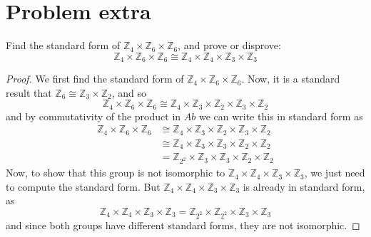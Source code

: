 \documentclass[fontsize=11pt]{scrartcl} %
\numberwithin{equation}{section} %
\numberwithin{figure}{section} %
\numberwithin{table}{section} %
\newcommand{\Z}{\mathbb{Z}}
\begin{document}
\section*{Problem extra}
Find the standard form of $\Z_4\times\Z_6\times\Z_6$, and prove or disprove:
\[
    \Z_4\times\Z_6\times\Z_6\cong \Z_4\times\Z_4\times\Z_3\times\Z_3
\]
\begin{proof}
    We first find the standard form of $\Z_4\times \Z_6\times \Z_6$. Now, it is
    a standard result that $\Z_6 \cong \Z_3\times \Z_2$, and so
    \[
        \Z_4\times \Z_6\times \Z_6\cong \Z_4\times \Z_3\times
        \Z_2\times\Z_3\times\Z_2
    \]
    and by commutativity of the product in $Ab$ we can write this in standard
    form as
    \[
\begin{aligned}
        \Z_4\times \Z_6\times \Z_6 &\cong \Z_4\times \Z_3\times
        \Z_2\times\Z_3\times\Z_2\\
        &\cong \Z_4\times \Z_3\times\Z_3\times\Z_2\times\Z_2\\
        &=\Z_{2^2}\times \Z_3\times\Z_3\times\Z_2\times\Z_2
\end{aligned}
    \]
    Now, to show that this group is not isomorphic to $\Z_4\times\Z_4\times
    \Z_3\times\Z_3$, we just need to compute the standard form. But
    $\Z_4\times\Z_4\times\Z_3\times\Z_3$ is already in standard form, as
    \[
        \Z_4\times\Z_4\times\Z_3\times\Z_3=\Z_{2^2}\times\Z_{2^2}\times\Z_3\times\Z_3
    \]  
    and since both groups have different standard forms, they are not
    isomorphic.

\end{proof}
\end{document}

